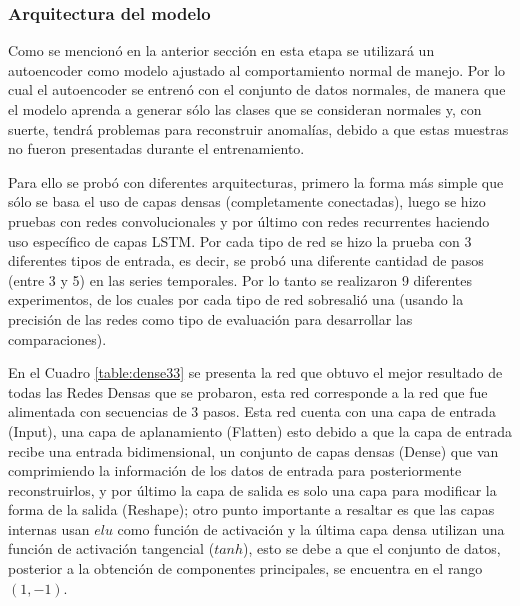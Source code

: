 \subsubsection{Arquitectura del modelo}

Como se mencion\'{o} en la anterior secci\'{o}n en esta etapa se utilizar\'{a} un autoencoder como modelo ajustado al comportamiento normal de manejo. Por lo cual el autoencoder se entren\'{o} con el conjunto de datos normales, de manera que el modelo aprenda a generar s\'{o}lo las clases que se consideran normales y, con suerte, tendr\'{a} problemas para reconstruir anomal\'{i}as, debido a que estas muestras no fueron presentadas durante el entrenamiento.

\vspace{5mm} %

Para ello se prob\'{o} con diferentes arquitecturas, primero la forma m\'{a}s simple que s\'{o}lo se basa el uso de capas densas (completamente conectadas), luego se hizo pruebas con redes convolucionales y por \'{u}ltimo con redes recurrentes haciendo uso espec\'{i}fico de capas LSTM. Por cada tipo de red se hizo la prueba con 3 diferentes tipos de entrada, es decir, se prob\'{o} una diferente cantidad de pasos (entre 3 y  5) en las series temporales. Por lo tanto se realizaron 9 diferentes experimentos, de los cuales por cada tipo de red sobresali\'{o} una (usando la precisi\'{o}n de las redes como tipo de evaluaci\'{o}n para desarrollar las comparaciones).

\vspace{5mm} %

En el Cuadro \ref{table:dense33} se presenta la red que obtuvo el mejor resultado de todas las Redes Densas que se probaron, esta red corresponde a la red que fue alimentada con secuencias de 3 pasos. Esta red cuenta con una capa de entrada (Input), una capa de aplanamiento (Flatten) esto debido a que la capa de entrada recibe una entrada bidimensional, un conjunto de capas densas (Dense) que van comprimiendo la informaci\'{o}n de los datos de entrada para posteriormente reconstruirlos, y por \'{u}ltimo la capa de salida es solo una capa para modificar la forma de la salida (Reshape); otro punto importante a resaltar es que las capas internas usan $elu$ como funci\'{o}n de activaci\'{o}n y la \'{u}ltima capa densa utilizan una funci\'{o}n de activaci\'{o}n tangencial ($tanh$), esto se debe a que el conjunto de datos, posterior a la obtenci\'{o}n de componentes principales, se encuentra en el rango $(1, -1)$.

